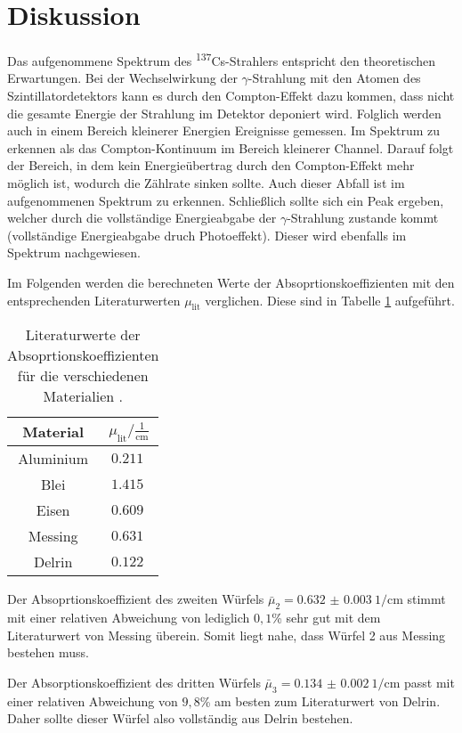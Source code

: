 \section{Diskussion}
\label{sec:Diskussion}

Das aufgenommene Spektrum des \textsuperscript{137}Cs-Strahlers entspricht den
theoretischen Erwartungen. Bei der Wechselwirkung der $\gamma$-Strahlung mit den
Atomen des Szintillatordetektors kann es durch den Compton-Effekt dazu kommen, dass
nicht die gesamte Energie der Strahlung im Detektor deponiert wird. Folglich werden
auch in einem Bereich kleinerer Energien Ereignisse gemessen. Im Spektrum zu erkennen
als das Compton-Kontinuum im Bereich kleinerer Channel. Darauf folgt der Bereich,
in dem kein Energieübertrag durch den Compton-Effekt mehr möglich ist, wodurch die
Zählrate sinken sollte. Auch dieser Abfall ist im aufgenommenen Spektrum zu erkennen.
Schließlich sollte sich ein Peak ergeben, welcher durch die vollständige Energieabgabe
der $\gamma$-Strahlung zustande kommt (vollständige Energieabgabe druch Photoeffekt).
Dieser wird ebenfalls im Spektrum nachgewiesen.

Im Folgenden werden die berechneten Werte der Absoprtionskoeffizienten mit den
entsprechenden Literaturwerten $\mu_{\mathrm{lit}}$ verglichen. Diese sind in Tabelle \ref{tab:literatur}
aufgeführt.

\begin{table}[H]
  \centering
  \caption{Literaturwerte der Absoprtionskoeffizienten für die verschiedenen Materialien \cite{sample2}.}
  \label{tab:literatur}
  \begin{tabular}{c c}
    \toprule
    Material &  $\mu_{\mathrm{lit}} / \frac{1}{\mathrm{cm}}$  \\
    \midrule
        Aluminium    & $\SI{0.211}{}$ \\
        Blei    & $\SI{1.415}{}$ \\
        Eisen & $\SI{0.609}{}$ \\
        Messing    & $\SI{0.631}{}$ \\
        Delrin & $\SI{0.122}{}$ \\
    \bottomrule
  \end{tabular}
\end{table}

Der Absoprtionskoeffizient des zweiten Würfels $\bar\mu_2 = \SI{0.632(3)}{1\per\centi\meter}$
stimmt mit einer relativen Abweichung von lediglich $0,1$\% sehr gut mit dem Literaturwert
von Messing überein. Somit liegt nahe, dass Würfel 2 aus Messing bestehen muss.

Der Absorptionskoeffizient des dritten Würfels $\bar\mu_3 = \SI{0.134(2)}{1\per\centi\meter}$
passt mit einer relativen Abweichung von $9,8$\% am besten zum Literaturwert von
Delrin. Daher sollte dieser Würfel also vollständig aus Delrin bestehen.
